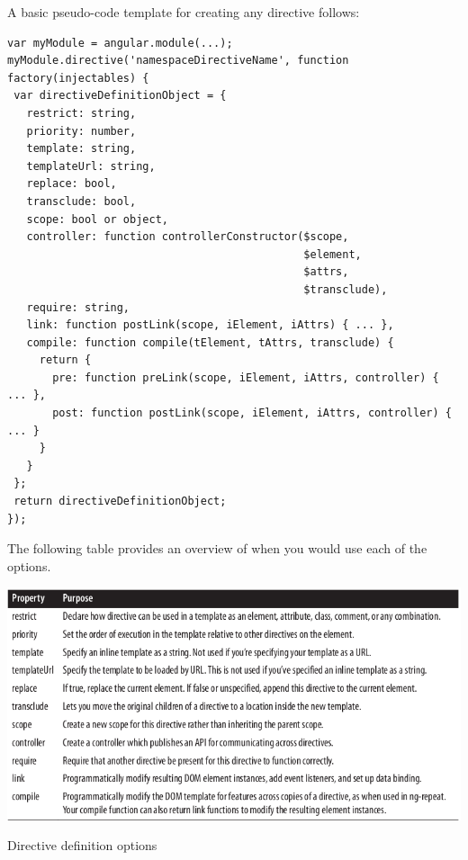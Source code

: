 \documentclass[14pt,a4paper]{extreport}
\begin{document}
A basic pseudo-code template for creating any directive follows: 
\begin{verbatim}
var myModule = angular.module(...);
myModule.directive('namespaceDirectiveName', function factory(injectables) {
 var directiveDefinitionObject = {
   restrict: string,
   priority: number,
   template: string,
   templateUrl: string,
   replace: bool,
   transclude: bool,
   scope: bool or object,
   controller: function controllerConstructor($scope,
                                              $element,
                                              $attrs,
                                              $transclude),
   require: string,
   link: function postLink(scope, iElement, iAttrs) { ... },
   compile: function compile(tElement, tAttrs, transclude) {
     return {
       pre: function preLink(scope, iElement, iAttrs, controller) { ... },
       post: function postLink(scope, iElement, iAttrs, controller) { ... }
     }
   }
 };
 return directiveDefinitionObject;
});
\end{verbatim}			
The following table provides an overview of when you would use each of the options.
\begin{table}[ht]
	\begin{center}
		\includegraphics[scale=0.7]{DirectiveDefOpt.png}
		\caption{Directive definition options}
	\end{center}
\end{table}
\end{document}

